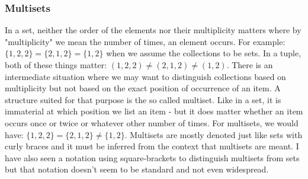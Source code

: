 



\subsubsection{Multisets}
In a set, neither the order of the elements nor their multiplicity matters where by "multiplicity" we mean the number of times, an element occurs. For example: $\{ 1,2,2 \} = \{ 2,1,2 \} = \{ 1,2 \}$ when we assume the collections to be sets. In a tuple, both of these things matter: $(1,2,2) \neq (2,1,2) \neq (1,2)$. There is an intermediate situation where we may want to distinguish collections based on multiplicity but not based on the exact position of occurrence of an item. A structure suited for that purpose is the so called multiset. Like in a set, it is immaterial at which position we list an item - but it does matter whether an item occurs once or twice or whatever other number of times. For multisets, we would have: $\{ 1,2,2 \} = \{ 2,1,2 \} \neq \{ 1,2 \}$. Multisets are mostly denoted just like sets with curly braces and it must be inferred from the context that multisets are meant. I have also seen a notation using square-brackets to distinguish multisets from sets but that notation doesn't seem to be standard and not even widespread.





